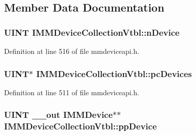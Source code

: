 \subsection{Member Data Documentation}
\subsubsection[{\texorpdfstring{n\+Device}{nDevice}}]{ {\bf U\+I\+NT} I\+M\+M\+Device\+Collection\+Vtbl\+::n\+Device}\hypertarget{struct_i_m_m_device_collection_vtbl_a47ebd4d63fad05206eb59e961d5b79f2}{}\label{struct_i_m_m_device_collection_vtbl_a47ebd4d63fad05206eb59e961d5b79f2}


Definition at line 516 of file mmdeviceapi.\+h.

\subsubsection[{\texorpdfstring{pc\+Devices}{pcDevices}}]{ {\bf U\+I\+NT}$\ast$ I\+M\+M\+Device\+Collection\+Vtbl\+::pc\+Devices}\hypertarget{struct_i_m_m_device_collection_vtbl_a72c968f5f5026e5d3056d3578a903ef1}{}\label{struct_i_m_m_device_collection_vtbl_a72c968f5f5026e5d3056d3578a903ef1}


Definition at line 511 of file mmdeviceapi.\+h.

\subsubsection[{\texorpdfstring{pp\+Device}{ppDevice}}]{ {\bf U\+I\+NT} {\bf \+\_\+\+\_\+out} {\bf I\+M\+M\+Device}$\ast$$\ast$ I\+M\+M\+Device\+Collection\+Vtbl\+::pp\+Device}\hypertarget{struct_i_m_m_device_collection_vtbl_a3543ad84c99d3a118199115cd2d6e77b}{}\label{struct_i_m_m_device_collection_vtbl_a3543ad84c99d3a118199115cd2d6e77b}


